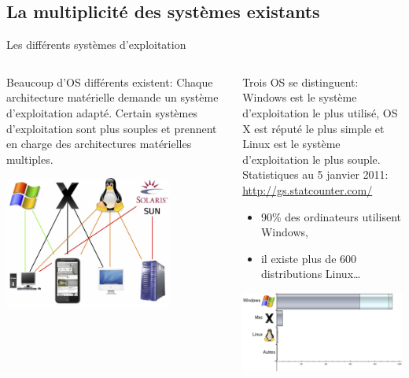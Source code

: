 \subsection{La multiplicité des systèmes existants}
\begin{frame}{Les différents systèmes d'exploitation}
  \begin{columns}
    \begin{column}{5.5cm}
      \begin{block}{Beaucoup d'OS différents existent:}
        Chaque architecture matérielle demande un système d'exploitation
        adapté. Certain systèmes d'exploitation sont plus souples et
        prennent en charge des architectures matérielles multiples.
      \end{block}
      \begin{center}
        \includegraphics[width=5.5cm]{img/s01/OS_archi.jpg}
      \end{center}
    \end{column}
    \begin{column}{5.5cm}
      \begin{block}{Trois OS se distinguent:}
        Windows est le système d'exploitation le plus utilisé, OS X est réputé le plus simple et Linux est le système d'exploitation le plus souple.\\
        Statistiques au 5 janvier 2011: \url{http://gs.statcounter.com/}\\
        \begin{itemize}
        \item 90\% des ordinateurs utilisent Windows,
        \item il existe plus de 600 distributions Linux\dots
        \end{itemize}
      \end{block}
      \vrule
      \begin{center}
        \includegraphics[width=5.5cm]{img/s01/OS_utilises.jpg}
      \end{center}
    \end{column}
  \end{columns}
\end{frame}

